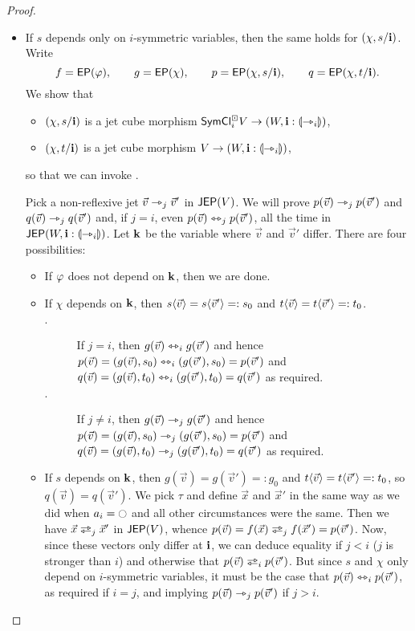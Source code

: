 \documentclass[a4paper]{memoir}
\begin{document}
\begin{proof}
\begin{itemize}
\begin{itemize}
\begin{itemize}
				\item If $s$ depends only on $i$-symmetric variables, then the same holds for $(\chi, s / \mathbf{i})$. Write
				\[
					f = \mathsf{EP}(\varphi), \qquad
					g = \mathsf{EP}(\chi), \qquad
					p = \mathsf{EP}(\chi, s/\mathbf{i}), \qquad
					q = \mathsf{EP}(\chi, t/\mathbf{i}).
				\]
				We show that
				\begin{itemize}
					\item $(\chi, s / \mathbf{i})$ is a jet cube morphism $\mathsf{SymCl}^\boxdot_i V \to (W, \mathbf{i} : {\llparenthesis \rightarrowtriangle_i \rrparenthesis})$,
					\item $(\chi, t / \mathbf{i})$ is a jet cube morphism $V \to (W, \mathbf{i} : {\llparenthesis \rightarrowtriangle_i \rrparenthesis})$,
				\end{itemize}
				so that we can invoke .
				
				Pick a non-reflexive jet $\vec v \rightarrowtriangle_j \vec v'$ in $\mathsf{JEP}(V)$.
				We will prove $p(\vec v) \rightarrowtriangle_j p(\vec v')$ and $q(\vec v) \rightarrowtriangle_j q(\vec v')$ and, if $j = i$, even $p(\vec v) \leftrightarrowtriangle_j p(\vec v')$, all the time in $\mathsf{JEP}(W, \mathbf{i} : {\llparenthesis \rightarrowtriangle_i \rrparenthesis})$.
				Let $\mathbf{k}$ be the variable where $\vec v$ and $\vec v'$ differ.
				There are four possibilities:
				\begin{itemize}
					\item If $\varphi$ does not depend on $\mathbf{k}$, then we are done.
					\item If $\chi$ depends on $\mathbf{k}$, then $s \langle \vec v \rangle = s \langle \vec v' \rangle =: s_0$ and $t \langle \vec v \rangle = t \langle \vec v' \rangle =: t_0$.
					\begin{description}
						\item[$\cdot$] If $j = i$, then $g(\vec v) \leftrightarrowtriangle_i g(\vec v')$ and hence $p(\vec v) = (g(\vec v), s_0) \leftrightarrowtriangle_i (g(\vec v'), s_0) = p(\vec v')$ and $q(\vec v) = (g(\vec v), t_0) \leftrightarrowtriangle_i (g(\vec v'), t_0) = q(\vec v')$ as required.
						\item[$\cdot$] If $j \neq i$, then $g(\vec v) \rightarrowtriangle_j g(\vec v')$ and hence $p(\vec v) = (g(\vec v), s_0) \rightarrowtriangle_j (g(\vec v'), s_0) = p(\vec v')$ and $q(\vec v) = (g(\vec v), t_0) \rightarrowtriangle_j (g(\vec v'), t_0) = q(\vec v')$ as required.
					\end{description}
					\item If $s$ depends on $\mathbf{k}$, then $g(\vec v) = g(\vec v') =: g_0$ and $t \langle \vec v \rangle = t \langle \vec v' \rangle =: t_0$, so $q(\vec v) = q(\vec v')$.
					We pick $\tau$ and define $\vec x$ and $\vec x'$ in the same way as we did when $a_i = \npolar$ and all other circumstances were the same.
					Then we have $\vec x \infrajet_j \vec x'$ in $\mathsf{JEP}(V)$, whence $p(\vec v) = f(\vec x) \infrajet_j f(\vec x') = p(\vec v')$.
					Now, since these vectors only differ at $\mathbf{i}$, we can deduce equality if $j < i$ ($j$ is stronger than $i$) and otherwise that $p(\vec v) \infrajet_i p(\vec v')$.
					But since $s$ and $\chi$ only depend on $i$-symmetric variables, it must be the case that $p(\vec v) \leftrightarrowtriangle_i p(\vec v')$, as required if $i = j$, and implying $p(\vec v) \rightarrowtriangle_j p(\vec v')$ if $j > i$.
					

\end{itemize}
\end{itemize}
\end{itemize}
\end{itemize}
\end{proof}
\end{document}

